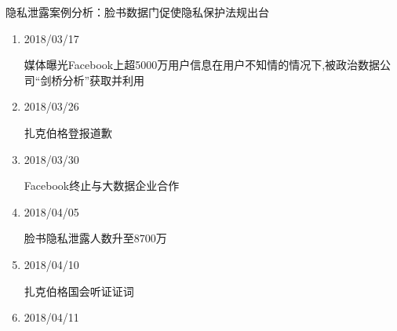 \documentclass[11pt]{beamer}
\begin{document}
\begin{frame}{隐私泄露案例分析：脸书数据门促使隐私保护法规出台}
	
	\begin{minipage}[t]{0.5\linewidth}
		\tiny
		\begin{enumerate}
			\item 2018/03/17 
			
			媒体曝光Facebook上超5000万用户信息在用户不知情的情况下,被政治数据公司“剑桥分析”获取并利用
			\item 2018/03/26 
			
			扎克伯格登报道歉
			\item 2018/03/30 
			
			Facebook终止与大数据企业合作
			\item 2018/04/05 
			
			脸书隐私泄露人数升至8700万
			\item 2018/04/10 
			
			扎克伯格国会听证证词
			\item 2018/04/11 
			

\end{enumerate}
\end{minipage}
\end{frame}
\end{document}
